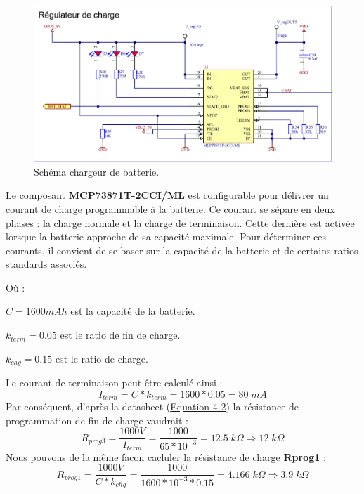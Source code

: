 \begin{figure}[h]
	\centering
	\includegraphics[width=.93\linewidth]{../figures/etude/sch/CHRG-BAT}
	\caption{Schéma chargeur de batterie.}
	\label{fig:chrg-bat}
\end{figure}

Le composant \textbf{MCP73871T-2CCI/ML} est configurable pour délivrer un courant de charge programmable à la batterie. Ce courant se sépare en deux phases : la charge normale et la charge de terminaison. Cette dernière est activée lorsque la batterie approche de sa capacité maximale. Pour déterminer ces courants, il convient de se baser sur la capacité de la batterie et de certains ratios standards associés.

Où :

$C = 1600 mAh$ est la capacité de la batterie.

$k_{term} = 0.05$ est le ratio de fin de charge.

$k_{chg} = 0.15$ est le ratio de charge.

Le courant de terminaison peut être calculé ainsi :
\begin{equation*}
	I_{term} = C * k_{term} = 1600 * 0.05 = 80 \; mA
\end{equation*}
Par conséquent, d'après la \gls{datasheet} (\href{https://ww1.microchip.com/downloads/en/DeviceDoc/MCP73871-Data-Sheet-20002090E.pdf}{Equation 4-2}) la résistance de programmation de fin de charge vaudrait :
\begin{equation*}
	R_{prog3} = \frac{1000V}{I_{term}} = \frac{1000}{65*10^{-3}} = 12.5 \; k\Omega \Rightarrow 12 \; k\Omega
\end{equation*}
Nous pouvons de la même facon cacluler la résistance de charge \textbf{Rprog1} :
\begin{equation*}
	R_{prog1} = \frac{1000V}{C*k_{chg}} = \frac{1000}{1600*10^{-3}*0.15} = 4.166 \; k\Omega \Rightarrow 3.9 \; k\Omega
\end{equation*}

